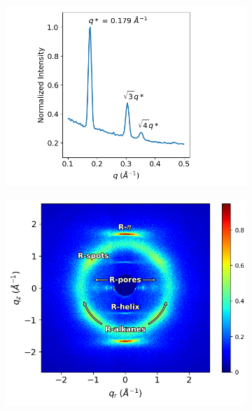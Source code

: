 \documentclass[journal=jpcbfk,manusciprt=article]{achemso}
\begin{document}
  \begin{figure}
        \centering
        \begin{subfigure}[t]{0.43\linewidth}
                \centering
                \includegraphics[width=\linewidth]{SAXS.png}
                \caption{}\label{fig:SAXS}
        \end{subfigure}
        \begin{subfigure}[t]{0.47\linewidth}
                \centering
                \includegraphics[width=\linewidth]{WAXS_annotated_words.png} 
                \caption{}\label{fig:WAXS}
        \end{subfigure}

\end{figure}
\end{document}

